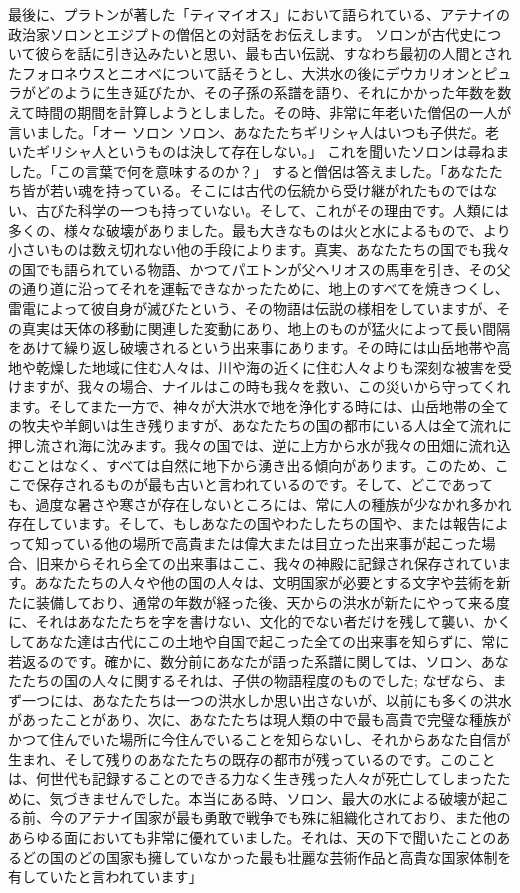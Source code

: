 \documentclass[10pt,twocolumn,letterpaper]{article}
\begin{document}
最後に、プラトンが著した「ティマイオス」において語られている、アテナイの政治家ソロンとエジプトの僧侶との対話をお伝えします。\cite{140} ソロンが古代史について彼らを話に引き込みたいと思い、最も古い伝説、すなわち最初の人間とされたフォロネウスとニオベについて話そうとし、大洪水の後にデウカリオンとピュラがどのように生き延びたか、その子孫の系譜を語り、それにかかった年数を数えて時間の期間を計算しようとしました。その時、非常に年老いた僧侶の一人が言いました。「オー ソロン ソロン、あなたたちギリシャ人はいつも子供だ。老いたギリシャ人というものは決して存在しない。」 これを聞いたソロンは尋ねました。「この言葉で何を意味するのか？」 すると僧侶は答えました。「あなたたち皆が若い魂を持っている。そこには古代の伝統から受け継がれたものではない、古びた科学の一つも持っていない。そして、これがその理由です。人類には多くの、様々な破壊がありました。最も大きなものは火と水によるもので、より小さいものは数え切れない他の手段によります。真実、あなたたちの国でも我々の国でも語られている物語、かつてパエトンが父ヘリオスの馬車を引き、その父の通り道に沿ってそれを運転できなかったために、地上のすべてを焼きつくし、雷電によって彼自身が滅びたという、その物語は伝説の様相をしていますが、その真実は天体の移動に関連した変動にあり、地上のものが猛火によって長い間隔をあけて繰り返し破壊されるという出来事にあります。その時には山岳地帯や高地や乾燥した地域に住む人々は、川や海の近くに住む人々よりも深刻な被害を受けますが、我々の場合、ナイルはこの時も我々を救い、この災いから守ってくれます。そしてまた一方で、神々が大洪水で地を浄化する時には、山岳地帯の全ての牧夫や羊飼いは生き残りますが、あなたたちの国の都市にいる人は全て流れに押し流され海に沈みます。我々の国では、逆に上方から水が我々の田畑に流れ込むことはなく、すべては自然に地下から湧き出る傾向があります。このため、ここで保存されるものが最も古いと言われているのです。そして、どこであっても、過度な暑さや寒さが存在しないところには、常に人の種族が少なかれ多かれ存在しています。そして、もしあなたの国やわたしたちの国や、または報告によって知っている他の場所で高貴または偉大または目立った出来事が起こった場合、旧来からそれら全ての出来事はここ、我々の神殿に記録され保存されています。あなたたちの人々や他の国の人々は、文明国家が必要とする文字や芸術を新たに装備しており、通常の年数が経った後、天からの洪水が新たにやって来る度に、それはあなたたちを字を書けない、文化的でない者だけを残して襲い、かくしてあなた達は古代にこの土地や自国で起こった全ての出来事を知らずに、常に若返るのです。確かに、数分前にあなたが語った系譜に関しては、ソロン、あなたたちの国の人々に関するそれは、子供の物語程度のものでした; なぜなら、まず一つには、あなたたちは一つの洪水しか思い出さないが、以前にも多くの洪水があったことがあり、次に、あなたたちは現人類の中で最も高貴で完璧な種族がかつて住んでいた場所に今住んでいることを知らないし、それからあなた自信が生まれ、そして残りのあなたたちの既存の都市が残っているのです。このことは、何世代も記録することのできる力なく生き残った人々が死亡してしまったために、気づきませんでした。本当にある時、ソロン、最大の水による破壊が起こる前、今のアテナイ国家が最も勇敢で戦争でも殊に組織化されており、また他のあらゆる面においても非常に優れていました。それは、天の下で聞いたことのあるどの国のどの国家も擁していなかった最も壮麗な芸術作品と高貴な国家体制を有していたと言われています」
\end{document}
